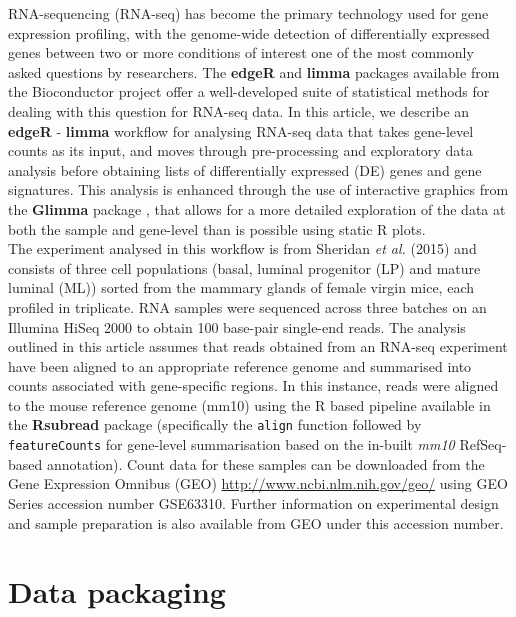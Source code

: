\documentclass[10pt,a4paper]{extarticle}\usepackage[]{graphicx}\usepackage[]{color}
\begin{document}
RNA-sequencing (RNA-seq) has become the primary technology used for gene expression profiling, with the genome-wide detection of differentially expressed genes between two or more conditions of interest one of the most commonly asked questions by researchers. The \textbf{edgeR} \cite{Robinson:Bioinformatics:2010} and \textbf{limma} packages \cite{Ritchie:NAR:2015} available from the Bioconductor project \cite{Huber:NatureMethods:2015} offer a well-developed suite of statistical methods for dealing with this question for RNA-seq data.
In this article, we describe an \textbf{edgeR} - \textbf{limma} workflow for analysing RNA-seq data that takes gene-level counts as its input, and moves through pre-processing and exploratory data analysis before obtaining lists of differentially expressed (DE) genes and gene signatures. This analysis is enhanced through the use of interactive graphics from the \textbf{Glimma} package \cite{Glimma:2016}, that allows for a more detailed exploration of the data at both the sample and gene-level than is possible using static \textsf{R} plots.\\

The experiment analysed in this workflow is from Sheridan {\it et al.} (2015) \cite{Sheridan:BMCCancer:2015} and consists of three cell populations (basal, luminal progenitor (LP) and mature luminal (ML)) sorted from the mammary glands of female virgin mice, each profiled in triplicate. RNA samples were sequenced across three batches on an Illumina HiSeq 2000 to obtain 100 base-pair single-end reads. 
The analysis outlined in this article assumes that reads obtained from an RNA-seq experiment have been aligned to an appropriate reference genome and summarised into counts associated with gene-specific regions. In this instance, reads were aligned to the mouse reference genome (mm10) using the \textsf{R} based pipeline available in the \textbf{Rsubread} package (specifically the \texttt{align} function \cite{Liao:NAR:2013} followed by \texttt{featureCounts} \cite{Liao:Bioinformatics:2014} for gene-level summarisation based on the in-built {\it mm10} RefSeq-based annotation).  
Count data for these samples can be downloaded from the Gene Expression Omnibus (GEO) \url{http://www.ncbi.nlm.nih.gov/geo/} using GEO Series accession number GSE63310. Further information on experimental design and sample preparation is also available from GEO under this accession number.



\section*{Data packaging}
\end{document}
